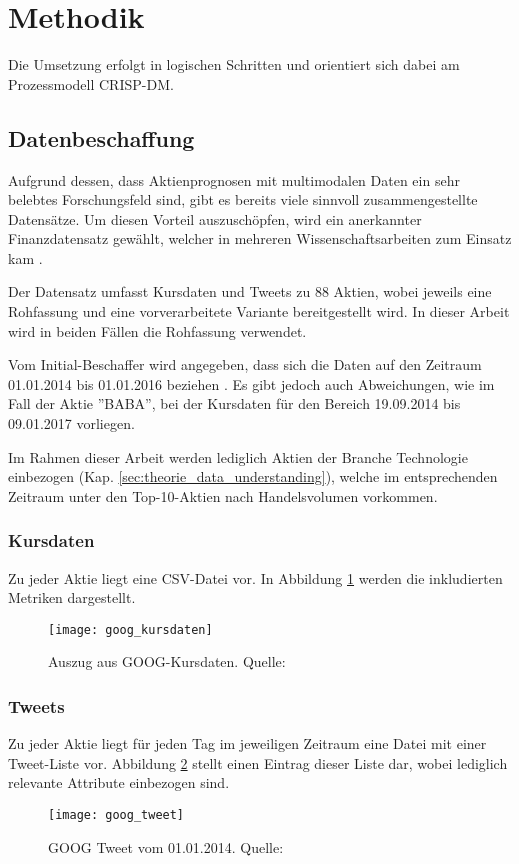 \newpage
\section{Methodik}
Die Umsetzung erfolgt in logischen Schritten und orientiert sich dabei am Prozessmodell \ac{CRISP-DM}.  

\subsection{Datenbeschaffung}\label{sec:data_ingestion}
Aufgrund dessen, dass Aktienprognosen mit multimodalen Daten ein sehr belebtes Forschungsfeld sind, gibt es bereits viele sinnvoll zusammengestellte Datensätze. Um diesen Vorteil auszuschöpfen, wird ein anerkannter Finanzdatensatz gewählt, welcher in mehreren Wissenschaftsarbeiten zum Einsatz kam \autocite{xu2018StockMovement}\autocite{Xu2020StockMovement}\autocite{zhang2022transformer}.

Der Datensatz umfasst Kursdaten und Tweets zu 88 Aktien, wobei jeweils eine Rohfassung und eine vorverarbeitete Variante bereitgestellt wird. In dieser Arbeit wird in beiden Fällen die Rohfassung verwendet. 

Vom Initial-Beschaffer wird angegeben, dass sich die Daten auf den Zeitraum 01.01.2014 bis 01.01.2016 beziehen \autocite[Kap. 3]{xu2018StockMovement}.
Es gibt jedoch auch Abweichungen, wie im Fall der Aktie ''BABA'', bei der Kursdaten für den Bereich 19.09.2014 bis 09.01.2017 vorliegen.

Im Rahmen dieser Arbeit werden lediglich Aktien der Branche Technologie einbezogen (Kap. \ref{sec:theorie_data_understanding}), welche im entsprechenden Zeitraum unter den Top-10-Aktien nach Handelsvolumen vorkommen. 

\subsubsection*{Kursdaten}\label{sec:data_ingestion_stockdata}
Zu jeder Aktie liegt eine \ac{CSV}-Datei vor. In Abbildung \ref{fig:goog_kursdaten} werden die inkludierten Metriken dargestellt.
\newpage
\begin{figure}[H]
	\texttt{[image: goog\_kursdaten]}
	\caption[Auszug aus GOOG-Kursdaten]{Auszug aus GOOG-Kursdaten. Quelle: \autocite{website:stocknet-dataset}}
	\label{fig:goog_kursdaten}
\end{figure}
 

\subsubsection*{Tweets}\label{sec:data_ingestion_tweetdata}
Zu jeder Aktie liegt für jeden Tag im jeweiligen Zeitraum eine Datei mit einer Tweet-Liste vor. Abbildung \ref{fig:goog_tweet} stellt einen Eintrag dieser Liste dar, wobei lediglich relevante Attribute einbezogen sind.
\begin{figure}[H]
	\texttt{[image: goog\_tweet]}
	\caption[GOOG Tweet vom 01.01.2014]{GOOG Tweet vom 01.01.2014. Quelle: \autocite{website:stocknet-dataset}}
	\label{fig:goog_tweet}
\end{figure}


